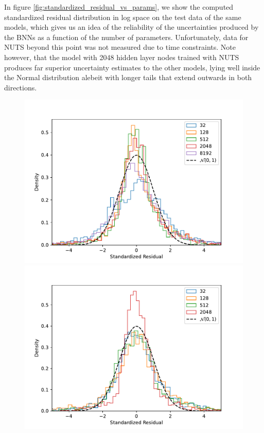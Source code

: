 In figure \ref{fig:standardized_residual_vs_params}, we show the computed standardized residual distribution in log space on the test data of the same models, which gives us an idea of the reliability of the uncertainties produced by the BNNs as a function of the number of parameters. Unfortunately, data for NUTS beyond this point was not measured due to time constraints. Note however, that the model with 2048 hidden layer nodes trained with NUTS produces far superior uncertainty estimates to the other models, lying well inside the Normal distribution alebeit with longer tails that extend outwards in both directions.
\begin{figure}[H]
    \centering
    \includegraphics[scale=0.7]{figures/standardized_residuals/effect_of_num_params/standardized_residual_HMC.pdf}
    \includegraphics[scale=0.7]{figures/standardized_residuals/effect_of_num_params/standardized_residual_NUTS.pdf}

\end{figure}

